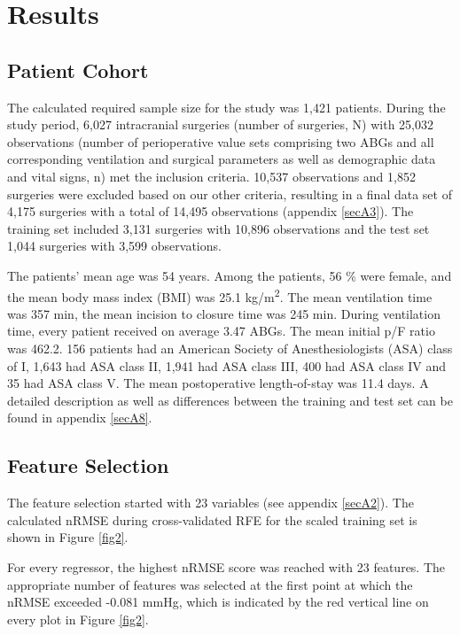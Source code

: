 \documentclass[referee,lineno,pdflatex,sn-nature]{sn-jnl}%
\theoremstyle{thmstyleone}%
\theoremstyle{thmstyletwo}%
\theoremstyle{thmstylethree}%
\begin{document}
\section{Results}\label{sec3}

\subsection{Patient Cohort}\label{sec3.1}
The calculated required sample size for the study was 1,421 patients. During the study period, 6,027 intracranial surgeries (number of surgeries, N) with 25,032 observations (number of perioperative value sets comprising two ABGs and all corresponding ventilation and surgical parameters as well as demographic data and vital signs, n) met the inclusion criteria. 10,537 observations and 1,852 surgeries were excluded based on our other criteria, resulting in a final data set of 4,175 surgeries with a total of 14,495 observations (appendix \ref{secA3}). The training set included 3,131 surgeries with 10,896 observations and the test set 1,044 surgeries with 3,599 observations.

The patients’ mean age was 54 years. Among the patients, 56 \% were female, and the mean body mass index (BMI) was 25.1 kg/m\textsuperscript{2}. The mean ventilation time was 357 min, the mean incision to closure time was 245 min. During ventilation time, every patient received on average 3.47 ABGs. The mean initial p/F ratio was 462.2. 156 patients had an American Society of Anesthesiologists (ASA) class of I, 1,643 had ASA class II, 1,941 had ASA class III, 400 had ASA class IV and 35 had ASA class V. The mean postoperative length-of-stay was 11.4 days. A detailed description as well as differences between the training and test set can be found in appendix \ref{secA8}.

\subsection{Feature Selection}\label{sec3.2}
The feature selection started with 23 variables (see appendix \ref{secA2}). The calculated nRMSE during cross-validated RFE for the scaled training set is shown in Figure \ref{fig2}. 

For every regressor, the highest nRMSE score was reached with 23 features. The appropriate number of features was selected at the first point at which the nRMSE exceeded -0.081 mmHg, which is indicated by the red vertical line on every plot in Figure \ref{fig2}.
\end{document}
